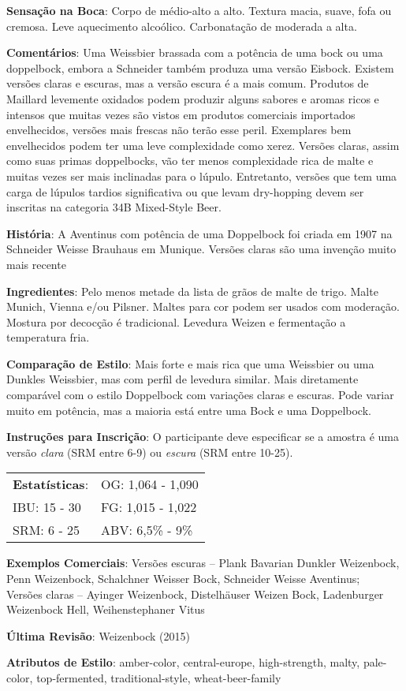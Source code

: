 \textbf{Sensação na Boca}: Corpo de médio-alto a alto. Textura macia, suave, fofa ou cremosa. Leve aquecimento alcoólico. Carbonatação de moderada a alta.

\textbf{Comentários}: Uma Weissbier brassada com a potência de uma bock ou uma doppelbock, embora a Schneider também produza uma versão Eisbock. Existem versões claras e escuras, mas a versão escura é a mais comum. Produtos de Maillard levemente oxidados podem produzir alguns sabores e aromas ricos e intensos que muitas vezes são vistos em produtos comerciais importados envelhecidos, versões mais frescas não terão esse peril. Exemplares bem envelhecidos podem ter uma leve complexidade como xerez. Versões claras, assim como suas primas doppelbocks, vão ter menos complexidade rica de malte e muitas vezes ser mais inclinadas para o lúpulo. Entretanto, versões que tem uma carga de lúpulos tardios significativa ou que levam dry-hopping devem ser inscritas na categoria 34B Mixed-Style Beer.

\textbf{História}: A Aventinus com potência de uma Doppelbock foi criada em 1907 na Schneider Weisse Brauhaus em Munique. Versões claras são uma invenção muito mais recente

\textbf{Ingredientes}: Pelo menos metade da lista de grãos de malte de trigo. Malte Munich, Vienna e/ou Pilsner. Maltes para cor podem ser usados com moderação. Mostura por decocção é tradicional. Levedura Weizen e fermentação a temperatura fria.

\textbf{Comparação de Estilo}: Mais forte e mais rica que uma Weissbier ou uma Dunkles Weissbier, mas com perfil de levedura similar. Mais diretamente comparável com o estilo Doppelbock com variações claras e escuras. Pode variar muito em potência, mas a maioria está entre uma Bock e uma Doppelbock.

\textbf{Instruções para Inscrição}: O participante deve especificar se a amostra é uma versão \textit{clara} (SRM entre 6-9) ou \textit{escura} (SRM entre 10-25).

\begin{tabular}{@{}p{35mm}p{35mm}@{}}
  \textbf{Estatísticas}: & OG: 1,064 - 1,090 \\
  IBU: 15 - 30 & FG: 1,015 - 1,022 \\
  SRM: 6 - 25 & ABV: 6,5\% - 9\%
\end{tabular}

\textbf{Exemplos Comerciais}: Versões escuras – Plank Bavarian Dunkler Weizenbock, Penn Weizenbock, Schalchner Weisser Bock, Schneider Weisse Aventinus; \\
Versões claras – Ayinger Weizenbock, Distelhäuser Weizen Bock, Ladenburger Weizenbock Hell, Weihenstephaner Vitus

\textbf{Última Revisão}: Weizenbock (2015)

\textbf{Atributos de Estilo}: amber-color, central-europe, high-strength, malty, pale-color, top-fermented, traditional-style, wheat-beer-family